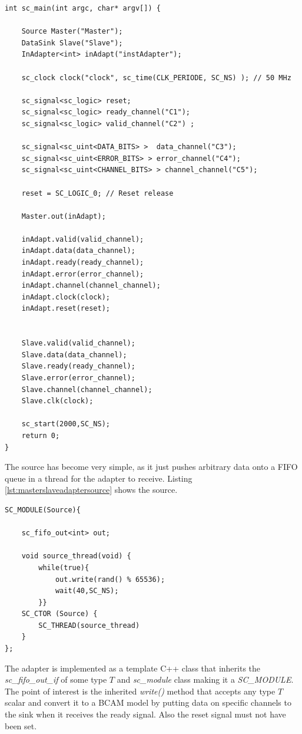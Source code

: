 \begin{lstlisting}[style=customc++, caption=Application file for master/slave with an adapter.,
label={lst:masterslaveadaptermain}]
int sc_main(int argc, char* argv[]) {

	Source Master("Master");
	DataSink Slave("Slave");
	InAdapter<int> inAdapt("instAdapter");
	
	sc_clock clock("clock", sc_time(CLK_PERIODE, SC_NS) ); // 50 MHz
	
	sc_signal<sc_logic> reset;
	sc_signal<sc_logic> ready_channel("C1");
	sc_signal<sc_logic> valid_channel("C2") ;
	
	sc_signal<sc_uint<DATA_BITS> >  data_channel("C3");
	sc_signal<sc_uint<ERROR_BITS> > error_channel("C4");
	sc_signal<sc_uint<CHANNEL_BITS> > channel_channel("C5");
	
	reset = SC_LOGIC_0; // Reset release
	
	Master.out(inAdapt);
	
	inAdapt.valid(valid_channel);
	inAdapt.data(data_channel);
	inAdapt.ready(ready_channel);
	inAdapt.error(error_channel);
	inAdapt.channel(channel_channel);
	inAdapt.clock(clock);
	inAdapt.reset(reset);
	
	
	Slave.valid(valid_channel);
	Slave.data(data_channel);
	Slave.ready(ready_channel);
	Slave.error(error_channel);
	Slave.channel(channel_channel);
	Slave.clk(clock);

	sc_start(2000,SC_NS);
	return 0;
}
\end{lstlisting}

The source has become very simple, as it just pushes arbitrary data onto a FIFO queue in a thread for the adapter to receive. Listing \ref{lst:masterslaveadaptersource} shows the source.

\begin{lstlisting}[style=customc++, caption=Source module that generates data.,
label={lst:masterslaveadaptersource}]
SC_MODULE(Source){

	sc_fifo_out<int> out;
	
	void source_thread(void) {
		while(true){
			out.write(rand() % 65536);
			wait(40,SC_NS);
		}}
	SC_CTOR (Source) {
		SC_THREAD(source_thread)
	}
};
\end{lstlisting}

The adapter is implemented as a template C++ class that inherits the \textit{sc\_fifo\_out\_if} of some type $T$ and \textit{sc\_module} class making it a \textit{SC\_MODULE}. The point of interest is the inherited \textit{write()} method that accepts any type $T$ scalar and convert it to a BCAM model by putting data on specific channels to the sink when it receives the ready signal. Also the reset signal must not have been set. 

